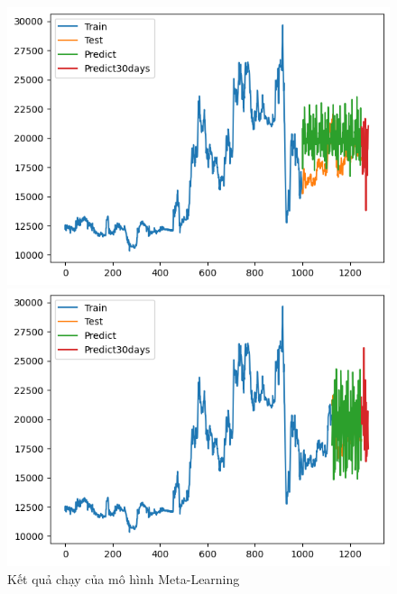 \begin{figure}[H]
\begin{minipage}{0.15\textwidth}
    \end{minipage}
    \hfill
    \begin{minipage}{0.15\textwidth}
    \centering
    \includegraphics[width=1\textwidth]{resources/chapter-5/result/EXB_ML_8_2.png}
    \end{minipage}
    \hfill
        \begin{minipage}{0.15\textwidth}
    \centering
    \includegraphics[width=1\textwidth]{resources/chapter-5/result/EXB_ML_9_1.png}
    \end{minipage}
    \hfill
    
    \caption{Kết quả chạy của mô hình Meta-Learning}
    \label{fig:ml_result}
\end{figure}





